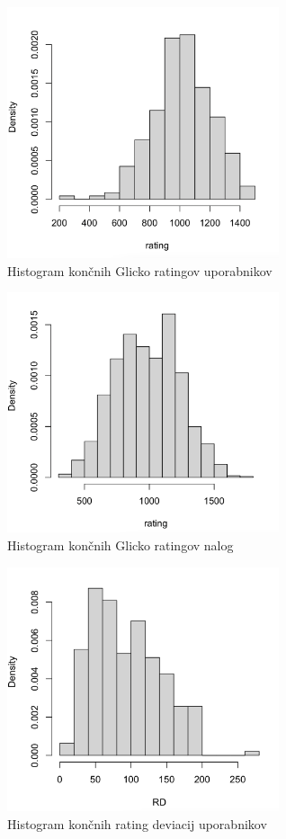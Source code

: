 \documentclass{IEEEtran}
\begin{document}
\begin{figure}[h!]
    \includegraphics[width=8cm]{GlickoUser}
    \caption{Histogram končnih Glicko ratingov uporabnikov}%
    \label{fig:glickoU}%
\end{figure}
\begin{figure}[h!]
    \includegraphics[width=8cm]{GlickoExercise}
    \caption{Histogram končnih Glicko ratingov nalog}%
    \label{fig:glickoE}%
\end{figure}
\begin{figure}[h!]
    \includegraphics[width=8cm]{GlickoUserRD}
    \caption{Histogram končnih rating deviacij uporabnikov}%
    \label{fig:userRD}%
\end{figure}
\end{document}

